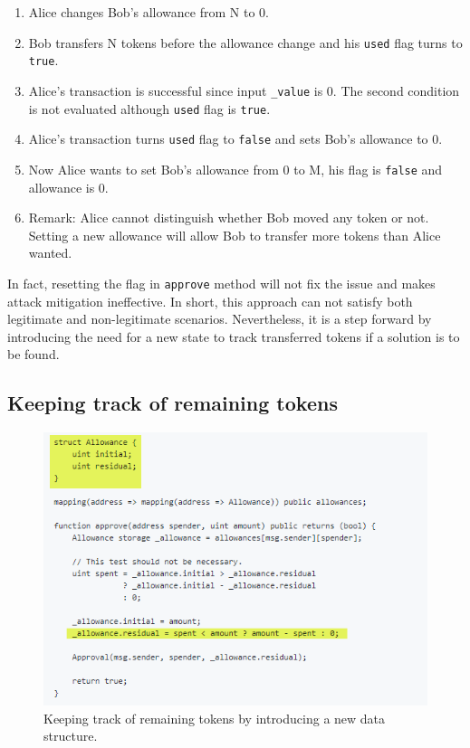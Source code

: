 \begin{enumerate}
	\item Alice changes Bob's allowance from N to 0.
	\item Bob transfers N tokens before the allowance change and his \texttt{used} flag turns to \texttt{true}.
	\item Alice's transaction is successful since input \texttt{\_value} is 0. The second condition is not evaluated although \texttt{used} flag is \texttt{true}.
	\item Alice's transaction turns \texttt{used} flag to \texttt{false} and sets Bob's allowance to 0. 
	\item Now Alice wants to set Bob's allowance from 0 to M, his flag is \texttt{false} and allowance is 0. 
	\item Remark: Alice cannot distinguish whether Bob moved any token or not. Setting a new allowance will allow Bob to transfer more tokens than Alice wanted.
\end{enumerate}

In fact, resetting the flag in \texttt{approve} method will not fix the issue and makes attack mitigation ineffective. In short, this approach can not satisfy both legitimate and non-legitimate scenarios. Nevertheless, it is a step forward by introducing the need for a new state to track transferred tokens if a solution is to be found.


\subsection{Keeping track of remaining tokens}

\begin{figure}[t]
	\centering
	\includegraphics[width=1.0\linewidth]{figures/multiple_withdrawal_29.png}
	\caption{Keeping track of remaining tokens by introducing a new data structure.\label{fig:track}}
\end{figure}

